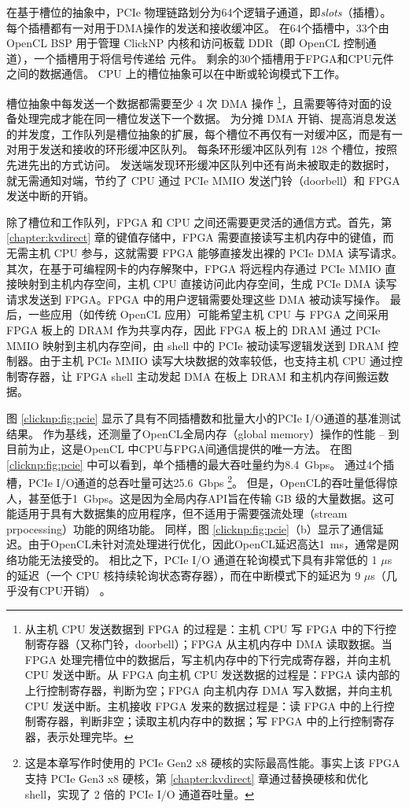 在基于槽位的抽象中，PCIe 物理链路划分为64个逻辑子通道，即\textit {slots}（插槽）。
每个插槽都有一对用于DMA操作的发送和接收缓冲区。
在64个插槽中，33个由 OpenCL BSP 用于管理 ClickNP 内核和访问板载 DDR（即 OpenCL 控制通道），一个插槽用于将信号传递给 \name 元件。
剩余的30个插槽用于FPGA和CPU元件之间的数据通信。
CPU 上的槽位抽象可以在中断或轮询模式下工作。

槽位抽象中每发送一个数据都需要至少 4 次 DMA 操作 \footnote{从主机 CPU 发送数据到 FPGA 的过程是：主机 CPU 写 FPGA 中的下行控制寄存器（又称门铃，doorbell）；FPGA 从主机内存中 DMA 读取数据。当 FPGA 处理完槽位中的数据后，写主机内存中的下行完成寄存器，并向主机 CPU 发送中断。从 FPGA 向主机 CPU 发送数据的过程是：FPGA 读内部的上行控制寄存器，判断为空；FPGA 向主机内存 DMA 写入数据，并向主机 CPU 发送中断。主机接收 FPGA 发来的数据过程是：读 FPGA 中的上行控制寄存器，判断非空；读取主机内存中的数据；写 FPGA 中的上行控制寄存器，表示处理完毕。}，且需要等待对面的设备处理完成才能在同一槽位发送下一个数据。
为分摊 DMA 开销、提高消息发送的并发度，工作队列是槽位抽象的扩展，每个槽位不再仅有一对缓冲区，而是有一对用于发送和接收的环形缓冲区队列。
每条环形缓冲区队列有 128 个槽位，按照先进先出的方式访问。
发送端发现环形缓冲区队列中还有尚未被取走的数据时，就无需通知对端，节约了 CPU 通过 PCIe MMIO 发送门铃（doorbell）和 FPGA 发送中断的开销。

除了槽位和工作队列，FPGA 和 CPU 之间还需要更灵活的通信方式。首先，第 \ref{chapter:kvdirect} 章的键值存储中，FPGA 需要直接读写主机内存中的键值，而无需主机 CPU 参与，这就需要 FPGA 能够直接发出裸的 PCIe DMA 读写请求。
其次，在基于可编程网卡的内存解聚中，FPGA 将远程内存通过 PCIe MMIO 直接映射到主机内存空间，主机 CPU 直接访问此内存空间，生成 PCIe DMA 读写请求发送到 FPGA。FPGA 中的用户逻辑需要处理这些 DMA 被动读写操作。
最后，一些应用（如传统 OpenCL 应用）可能希望主机 CPU 与 FPGA 之间采用 FPGA 板上的 DRAM 作为共享内存，因此 FPGA 板上的 DRAM 通过 PCIe MMIO 映射到主机内存空间，由 shell 中的 PCIe 被动读写逻辑发送到 DRAM 控制器。由于主机 PCIe MMIO 读写大块数据的效率较低，也支持主机 CPU 通过控制寄存器，让 FPGA shell 主动发起 DMA 在板上 DRAM 和主机内存间搬运数据。



图 \ref {clicknp:fig:pcie} 显示了具有不同插槽数和批量大小的PCIe I/O通道的基准测试结果。
作为基线，还测量了OpenCL全局内存（global memory）操作的性能 -- 到目前为止，这是OpenCL \cite {opencl} 中CPU与FPGA间通信提供的唯一方法。
在图 \ref {clicknp:fig:pcie} 中可以看到，单个插槽的最大吞吐量约为8.4~Gbps。
通过4个插槽，PCIe I/O通道的总吞吐量可达25.6~Gbps \footnote{这是本章写作时使用的 PCIe Gen2 x8 硬核的实际最高性能。事实上该 FPGA 支持 PCIe Gen3 x8 硬核，第 \ref{chapter:kvdirect} 章通过替换硬核和优化 shell，实现了 2 倍的 PCIe I/O 通道吞吐量。}。
但是，OpenCL的吞吐量低得惊人，甚至低于1~Gbps。这是因为全局内存API旨在传输 GB 级的大量数据。这可能适用于具有大数据集的应用程序，但不适用于需要强流处理（stream prpocessing）功能的网络功能。
同样，图 \ref {clicknp:fig:pcie}（b）显示了通信延迟。由于OpenCL未针对流处理进行优化，因此OpenCL延迟高达1~ms，通常是网络功能无法接受的。
相比之下，PCIe I/O 通道在轮询模式下具有非常低的 1 $\mu$s 的延迟（一个 CPU 核持续轮询状态寄存器），而在中断模式下的延迟为 9 $\mu$s（几乎没有CPU开销） 。

